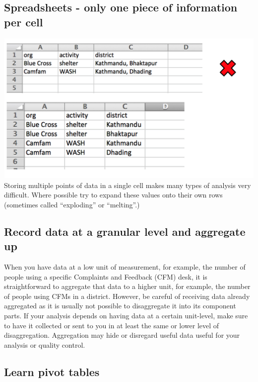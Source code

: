 \documentclass[
  a4paper,
  onecolumn,
  oneside]{book}
\begin{document}
\hypertarget{spreadsheets---only-one-piece-of-information-per-cell}{%
\subsection{Spreadsheets - only one piece of information per
cell}\label{spreadsheets---only-one-piece-of-information-per-cell}}

\includegraphics{part1/./images/onepercell.png}\\
Storing multiple points of data in a single cell makes many types of
analysis very difficult. Where possible try to expand these values onto
their own rows (sometimes called ``exploding'' or ``melting''.)

\hypertarget{record-data-at-a-granular-level-and-aggregate-up}{%
\subsection{Record data at a granular level and aggregate
up}\label{record-data-at-a-granular-level-and-aggregate-up}}

When you have data at a low unit of measurement, for example, the number
of people using a specific Complaints and Feedback (CFM) desk, it is
straightforward to aggregate that data to a higher unit, for example,
the number of people using CFMs in a district. However, be careful of
receiving data already aggregated as it is usually not possible to
disaggregate it into its component parts. If your analysis depends on
having data at a certain unit-level, make sure to have it collected or
sent to you in at least the same or lower level of disaggregation.
Aggregation may hide or disregard useful data useful for your analysis
or quality control.

\hypertarget{learn-pivot-tables}{%
\subsection{Learn pivot tables}\label{learn-pivot-tables}}
\end{document}
